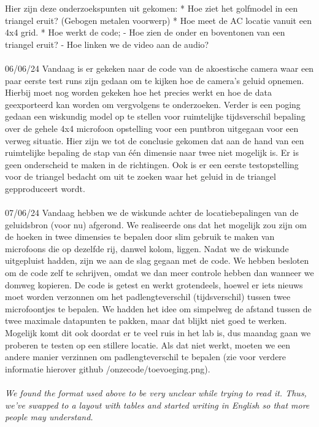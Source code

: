 \documentclass{article}
\begin{document}
Hier zijn deze onderzoekspunten uit gekomen:
    * Hoe ziet het golfmodel in een triangel eruit? (Gebogen metalen voorwerp)
    * Hoe meet de AC locatie vanuit een 4x4 grid.
    * Hoe werkt de code;
        - Hoe zien de onder en boventonen van een triangel eruit?
        - Hoe linken we de video aan de audio?\\
\\
06/06/24
Vandaag is er gekeken naar de code van de akoestische camera waar een paar eerste test runs zijn gedaan om te kijken hoe de camera's geluid opnemen. Hierbij moet nog worden gekeken hoe het precies werkt en hoe de data geexporteerd kan worden om vergvolgens te onderzoeken.
Verder is een poging gedaan een wiskundig model op te stellen voor ruimtelijke tijdsverschil bepaling over de gehele 4x4 microfoon opstelling voor een puntbron uitgegaan voor een verweg situatie. 
    Hier zijn we tot de conclusie gekomen dat aan de hand van een ruimtelijke bepaling de stap van één dimensie naar twee niet mogelijk is. Er is geen onderscheid te maken in de richtingen.
Ook is er een eerste testopstelling voor de triangel bedacht om uit te zoeken waar het geluid in de triangel gepproduceert wordt.\\
\\
07/06/24
Vandaag hebben we de wiskunde achter de locatiebepalingen van de geluidsbron (voor nu) afgerond. We realiseerde ons dat het mogelijk zou zijn om de hoeken in twee dimensies
te bepalen door slim gebruik te maken van microfoons die op dezelfde rij, danwel kolom, liggen. Nadat we de wiskunde uitgepluist hadden, zijn we aan de slag gegaan met de
code. We hebben besloten om de code zelf te schrijven, omdat we dan meer controle hebben dan wanneer we domweg kopieren. De code is getest en werkt grotendeels, hoewel er
iets nieuws moet worden verzonnen om het padlengteverschil (tijdsverschil) tussen twee microfoontjes te bepalen. We hadden het idee om simpelweg de afstand tussen de twee
maximale datapunten te pakken, maar dat blijkt niet goed te werken. Mogelijk komt dit ook doordat er te veel ruis in het lab is, dus maandag gaan we proberen te testen op
een stillere locatie. Als dat niet werkt, moeten we een andere manier verzinnen om padlengteverschil te bepalen (zie voor verdere informatie hierover github 
/onzecode/toevoeging.png).
\\
\\

\noindent \textit{We found the format used above to be very unclear while trying to read it. Thus, we've swapped to a layout with tables and started writing in English so that more people may understand.}
\end{document}
